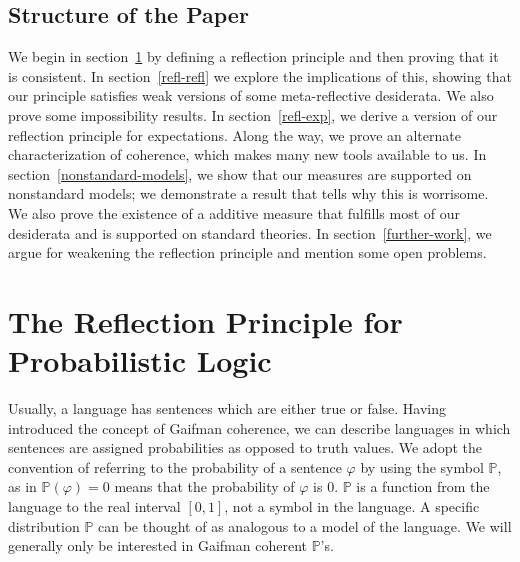 \documentclass[12pt]{article}
\newcommand{\PP}{\mathbb{P}}
\newcommand{\vp}{\varphi}
\theoremstyle{plain}
\theoremstyle{definition}
\theoremstyle{remark}
\begin{document}
\subsection{Structure of the Paper} %
We begin in section~\ref{refl-cons} by defining a reflection principle and then proving that it is consistent. 
In section~\ref{refl-refl} we explore the implications of this, showing that our principle satisfies weak versions of some meta-reflective desiderata. 
We also prove some impossibility results. In section~\ref{refl-exp}, we derive a version of our reflection principle for expectations. 
Along the way, we prove an alternate characterization of coherence, which makes many new tools available to us. 
In section~\ref{nonstandard-models}, we show that our measures are supported on nonstandard models; we demonstrate a result that tells why this is worrisome. 
We also prove the existence of a additive measure that fulfills most of our desiderata and is supported on standard theories. 
In section~\ref{further-work}, we argue for weakening the reflection principle and mention some open problems. %

\section{The Reflection Principle for Probabilistic Logic}
\label{refl-cons}




Usually, a language has sentences which are either true or false. Having introduced the concept of Gaifman coherence, we can describe languages in which sentences are assigned probabilities as opposed to truth values. We adopt the convention of referring to the probability of a sentence $\vp$ by using the symbol $\PP$, as in $\PP(\vp)=0$ means that the probability of $\vp$ is $0$. $\PP$ is a function from the language to the real interval $[0,1]$, not a symbol in the language. A specific distribution $\PP$ can be thought of as analogous to a model of the language. We will generally only be interested in Gaifman coherent $\PP$'s.
\end{document}
